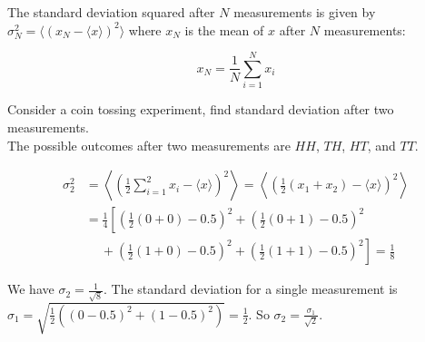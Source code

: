The standard deviation squared after $N$ measurements is given by $\sigma_N^2 = \langle (x_N - \langle x \rangle)^2 \rangle$ where $x_N$ is the mean of $x$ after $N$ measurements:

$$x_N = \frac{1}{N}\sum_{i=1}^N x_i$$

\begin{texample}
	Consider a coin tossing experiment, find standard deviation after two measurements. \\
	
	The possible outcomes after two measurements are $HH$, $TH$, $HT$, and $TT$.
	
	\begin{align*}
		\sigma_2^2 &= \left\langle \left( \frac12 \sum_{i=1}^2 x_i - \langle x \rangle \right)^2 \right\rangle  = \left\langle  \left(\frac12 \left(x_1 + x_2 \right)  - \langle x \rangle \right)^2\right\rangle \\
		&= \frac14 \left[ \left(\frac12(0+0)-0.5\right)^2 + \left(\frac12(0+1)-0.5\right)^2 \right. \\
		&\phantom{-} + \left. \left(\frac12(1+0)-0.5\right)^2 +\left(\frac12(1+1)-0.5\right)^2 \right] = \frac18
	\end{align*}
	
	We have $\sigma_2 = \frac{1}{\sqrt{8}}$. The standard deviation for a single measurement is $\sigma_1=\sqrt{\frac12 \left( (0-0.5)^2+(1-0.5)^2 \right)}=\frac{1}{2}$. So $\sigma_2 = \frac{\sigma_1}{\sqrt{2}}$.
\end{texample}

